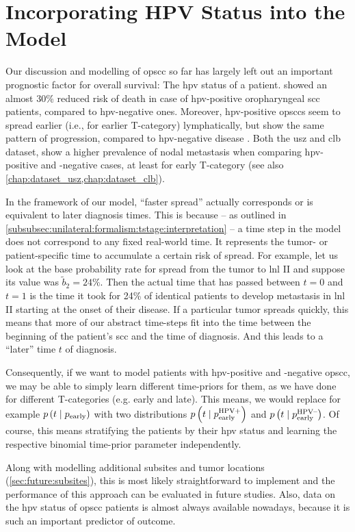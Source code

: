 \documentclass[\relativeRoot/main.tex]{subfiles}
\begin{document}
\section{Incorporating HPV Status into the Model}
\label{sec:future:hpv}

Our discussion and modelling of \gls{opscc} so far has largely left out an important prognostic factor for overall survival: The \gls{hpv} status of a patient.  showed an almost 30\% reduced risk of death in case of \gls{hpv}-positive oropharyngeal \gls{scc} patients, compared to \gls{hpv}-negative ones. Moreover, \gls{hpv}-positive \glspl{opscc} seem to spread earlier (i.e., for earlier T-category) lymphatically, but show the same pattern of progression, compared to \gls{hpv}-negative disease \cite{bauwens_prevalence_2021}. Both the \gls{usz} and \gls{clb} dataset, show a higher prevalence of nodal metastasis when comparing \gls{hpv}-positive and -negative cases, at least for early T-category \cite{ludwig_detailed_2022} (see also \cref{chap:dataset_usz,chap:dataset_clb}).

In the framework of our model, ``faster spread'' actually corresponds or is equivalent to later diagnosis times. This is because -- as outlined in \cref{subsubsec:unilateral:formalism:tstage:interpretation} -- a time step in the model does not correspond to any fixed real-world time. It represents the tumor- or patient-specific time to accumulate a certain risk of spread. For example, let us look at the base probability rate for spread from the tumor to \gls{lnl} II and suppose its value was $\tilde{b}_2 = 24\%$. Then the actual time that has passed between $t=0$ and $t=1$ is the time it took for 24\% of identical patients to develop metastasis in \gls{lnl} II starting at the onset of their disease. If a particular tumor spreads quickly, this means that more of our abstract time-steps fit into the time between the beginning of the patient's \gls{scc} and the time of diagnosis. And this leads to a ``later'' time $t$ of diagnosis.

Consequently, if we want to model patients with \gls{hpv}-positive and -negative \gls{opscc}, we may be able to simply learn different time-priors for them, as we have done for different T-categories (e.g. early and late). This means, we would replace for example $p \left( t \mid p_\text{early} \right)$ with two distributions $p \left( t \mid p_\text{early}^\text{HPV+} \right)$ and $p \left( t \mid p_\text{early}^\text{HPV--} \right)$. Of course, this means stratifying the patients by their \gls{hpv} status and learning the respective binomial time-prior parameter independently.

Along with modelling additional subsites and tumor locations (\cref{sec:future:subsites}), this is most likely straightforward to implement and the performance of this approach can be evaluated in future studies. Also, data on the \gls{hpv} status of \gls{opscc} patients is almost always available nowadays, because it is such an important predictor of outcome.
\end{document}
